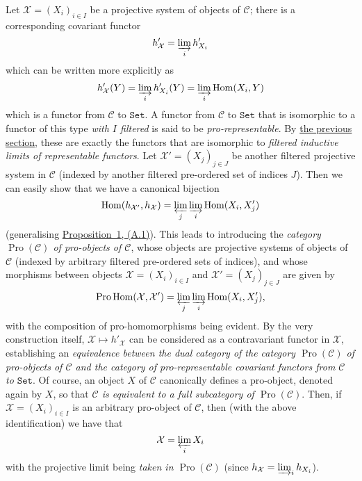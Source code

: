 \documentclass{article}
\renewcommand{\cal}[1]{{\mathcal{#1}}}
\newcommand{\Set}{\mathtt{Set}}
\DeclareMathOperator{\Hom}{Hom}
\DeclareMathOperator{\Pro}{Pro}
\newcommand{\oldpage}[1]{\marginpar{\footnotesize$\Big\vert$ \textit{p.~#1}}}
\begin{document}
Let $\cal{X}=(X_i)_{i\in I}$ be a projective system of objects of $\cal{C}$;
there is a corresponding covariant functor
\[
  h'_{\cal{X}} = \varinjlim_i h'_{X_i}
\]
which can be written more explicitly as
\[
  h'_{\cal{X}}(Y) = \varinjlim_i h'_{X_i}(Y) = \varinjlim_i\Hom(X_i,Y)
\]
which is a functor from $\cal{C}$ to $\Set$.
A functor from $\cal{C}$ to $\Set$ that is isomorphic to a functor of this type \emph{with $I$ filtered} is said to be \emph{pro-representable}.
By \hyperref[A.1]{the previous section}, these are exactly the functors that are isomorphic to \emph{filtered inductive limits of representable functors}.
Let $\cal{X}'=(X_j)_{j\in J}$ be another filtered projective system in $\cal{C}$ (indexed by another filtered pre-ordered set of indices $J$).
Then we can easily show that we have a canonical bijection
\[
  \Hom(h_{\cal{X}'},h_{\cal{X}}) = \varprojlim_j\varinjlim_i\Hom(X_i,X'_j)
\]
(generalising \hyperref[A.1-proposition1]{Proposition~1, (A.1)}).
This leads to introducing the \emph{category $\Pro(\cal{C})$ of pro-objects of $\cal{C}$}, whose objects are projective systems of objects of $\cal{C}$ (indexed by arbitrary filtered pre-ordered sets of indices), and whose morphisms between objects $\cal{X}=(X_i)_{i\in I}$ and $\cal{X}'=(X_j)_{j\in J}$ are given by
\[
  \Pro\Hom(\cal{X},\cal{X}') = \varprojlim_j\varinjlim_i\Hom(X_i,X'_j),
\]
with the composition of pro-homomorphisms being evident.
By the very construction itself, $\cal{X}\mapsto h'_{\cal{X}}$ can be considered as a contravariant functor in $\cal{X}$, establishing an \emph{equivalence between the dual category of the category $\Pro(\cal{C})$ of pro-objects of $\cal{C}$ and the category of pro-representable covariant functors from $\cal{C}$ to $\Set$}.
Of course, an object $X$ of $\cal{C}$ canonically defines a pro-object, denoted
\oldpage{195-04}
again by $X$, so that \emph{$\cal{C}$ is equivalent to a full subcategory of $\Pro(\cal{C})$}.
Then, if $\cal{X}=(X_i)_{i\in I}$ is an arbitrary pro-object of $\cal{C}$, then (with the above identification) we have that
\[
  \cal{X} = \varprojlim_i X_i
\]
with the projective limit being \emph{taken in $\Pro(\cal{C})$} (since $h_{\cal{X}}=\varinjlim_i h_{X_i}$).
\end{document}
